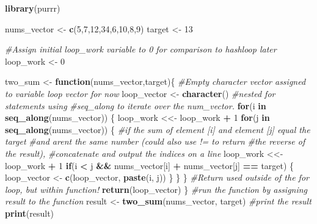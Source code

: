 \documentclass[
]{article}
\newenvironment{Shaded}{\begin{snugshade}}{\end{snugshade}}
\newcommand{\CommentTok}[1]{\textcolor[rgb]{0.56,0.35,0.01}{\textit{#1}}}
\newcommand{\ControlFlowTok}[1]{\textcolor[rgb]{0.13,0.29,0.53}{\textbf{#1}}}
\newcommand{\DecValTok}[1]{\textcolor[rgb]{0.00,0.00,0.81}{#1}}
\newcommand{\FunctionTok}[1]{\textcolor[rgb]{0.13,0.29,0.53}{\textbf{#1}}}
\newcommand{\NormalTok}[1]{#1}
\newcommand{\OtherTok}[1]{\textcolor[rgb]{0.56,0.35,0.01}{#1}}
\newcommand{\SpecialCharTok}[1]{\textcolor[rgb]{0.81,0.36,0.00}{\textbf{#1}}}
\begin{document}
\begin{Shaded}
\begin{Highlighting}[]
\FunctionTok{library}\NormalTok{(purrr)}

\NormalTok{nums\_vector }\OtherTok{\textless{}{-}} \FunctionTok{c}\NormalTok{(}\DecValTok{5}\NormalTok{,}\DecValTok{7}\NormalTok{,}\DecValTok{12}\NormalTok{,}\DecValTok{34}\NormalTok{,}\DecValTok{6}\NormalTok{,}\DecValTok{10}\NormalTok{,}\DecValTok{8}\NormalTok{,}\DecValTok{9}\NormalTok{)}
\NormalTok{target }\OtherTok{\textless{}{-}} \DecValTok{13}

\CommentTok{\#Assign initial loop\_work variable to 0 for comparison to hashloop later}
\NormalTok{loop\_work }\OtherTok{\textless{}{-}} \DecValTok{0}

\NormalTok{two\_sum }\OtherTok{\textless{}{-}} \ControlFlowTok{function}\NormalTok{(nums\_vector,target)\{}
  \CommentTok{\#Empty character vector assigned to variable loop vector for now}
\NormalTok{  loop\_vector }\OtherTok{\textless{}{-}} \FunctionTok{character}\NormalTok{()}
  \CommentTok{\#nested for statements using }
  \CommentTok{\#seq\_along to iterate over the num\_vector.}
    \ControlFlowTok{for}\NormalTok{(i }\ControlFlowTok{in} \FunctionTok{seq\_along}\NormalTok{(nums\_vector)) \{}
\NormalTok{      loop\_work }\OtherTok{\textless{}\textless{}{-}}\NormalTok{ loop\_work }\SpecialCharTok{+} \DecValTok{1}
      \ControlFlowTok{for}\NormalTok{(j }\ControlFlowTok{in} \FunctionTok{seq\_along}\NormalTok{(nums\_vector)) \{}
      \CommentTok{\#if the sum of element [i] and element [j] equal the target }
      \CommentTok{\#and aren\textquotesingle{}t the same number (could also use != to return}
      \CommentTok{\#the reverse of the result),}
      \CommentTok{\#concatenate and output the indices on a line}
\NormalTok{        loop\_work }\OtherTok{\textless{}\textless{}{-}}\NormalTok{ loop\_work }\SpecialCharTok{+} \DecValTok{1}
        \ControlFlowTok{if}\NormalTok{(i }\SpecialCharTok{\textless{}}\NormalTok{ j }\SpecialCharTok{\&\&}\NormalTok{ nums\_vector[i] }\SpecialCharTok{+}\NormalTok{ nums\_vector[j] }\SpecialCharTok{==}\NormalTok{ target) \{}
\NormalTok{          loop\_vector }\OtherTok{\textless{}{-}} \FunctionTok{c}\NormalTok{(loop\_vector, }\FunctionTok{paste}\NormalTok{(i, j))}
\NormalTok{      \}}
\NormalTok{    \}}
\NormalTok{    \}}
  \CommentTok{\#Return used outside of the for loop, but within function!}
  \FunctionTok{return}\NormalTok{(loop\_vector)}
\NormalTok{\}}
\CommentTok{\#run the function by assigning result to the function}
\NormalTok{result }\OtherTok{\textless{}{-}} \FunctionTok{two\_sum}\NormalTok{(nums\_vector, target)}
\CommentTok{\#print the result}
\FunctionTok{print}\NormalTok{(result)}
\end{Highlighting}
\end{Shaded}
\end{document}
